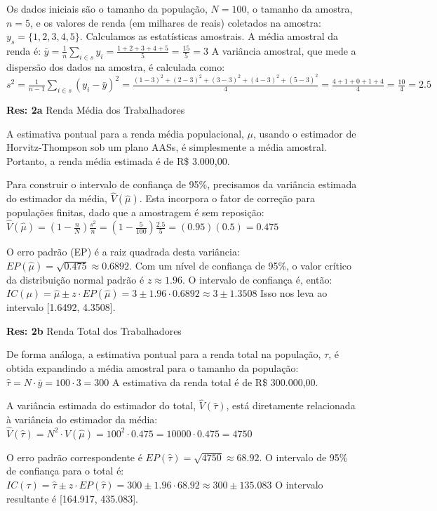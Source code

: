 \documentclass[a4paper,11pt,oneside,twocolumn]{Config/milktest}
\begin{document}
	
	{\scriptsize
		
		Os dados iniciais são o tamanho da população, $N=100$, o tamanho da amostra, $n=5$, e os valores de renda (em milhares de reais) coletados na amostra: $y_s = \{1, 2, 3, 4, 5\}$. Calculamos as estatísticas amostrais. A média amostral da renda é:
		$ \bar{y} = \frac{1}{n} \sum_{i \in s} y_i = \frac{1+2+3+4+5}{5} = \frac{15}{5} = 3 $ 
		A variância amostral, que mede a dispersão dos dados na amostra, é calculada como:
		$ s^2 = \frac{1}{n-1} \sum_{i \in s} (y_i - \bar{y})^2 = \frac{(1-3)^2 + (2-3)^2 + (3-3)^2 + (4-3)^2 + (5-3)^2}{4} = \frac{4+1+0+1+4}{4} = \frac{10}{4} = 2.5 $
		
		\textbf{Res:  2a}  Renda Média dos Trabalhadores
		
		A estimativa pontual para a renda média populacional, $\mu$, usando o estimador de Horvitz-Thompson sob um plano AASs, é simplesmente a média amostral. Portanto, a renda média estimada é de R\$ 3.000,00.
		
		Para construir o intervalo de confiança de 95\%, precisamos da variância estimada do estimador da média, $\hat{V}(\hat{\mu})$. Esta incorpora o fator de correção para populações finitas, dado que a amostragem é sem reposição:
		$ \hat{V}(\hat{\mu}) = \left(1 - \frac{n}{N}\right) \frac{s^2}{n} = \left(1 - \frac{5}{100}\right) \frac{2.5}{5} = (0.95)(0.5) = 0.475 $
		
		O erro padrão (EP) é a raiz quadrada desta variância: $EP(\hat{\mu}) = \sqrt{0.475} \approx 0.6892$.
		Com um nível de confiança de 95\%, o valor crítico da distribuição normal padrão é $z \approx 1.96$. O intervalo de confiança é, então:
		$ IC(\mu) = \hat{\mu} \pm z \cdot EP(\hat{\mu}) = 3 \pm 1.96 \cdot 0.6892 \approx 3 \pm 1.3508 $
		Isso nos leva ao intervalo [1.6492, 4.3508].
		
		\medskip
		\textbf{Res:  2b}   Renda Total dos Trabalhadores
		
		De forma análoga, a estimativa pontual para a renda total na população, $\tau$, é obtida expandindo a média amostral para o tamanho da população:
		$ \hat{\tau} = N \cdot \bar{y} = 100 \cdot 3 = 300 $
		A estimativa da renda total é de R\$ 300.000,00.
		
		A variância estimada do estimador do total, $\hat{V}(\hat{\tau})$, está diretamente relacionada à variância do estimador da média:
		$ \hat{V}(\hat{\tau}) = N^2 \cdot \hat{V}(\hat{\mu}) = 100^2 \cdot 0.475 = 10000 \cdot 0.475 = 4750 $
		
		O erro padrão correspondente é $EP(\hat{\tau}) = \sqrt{4750} \approx 68.92$. O intervalo de 95\% de confiança para o total é:
		$ IC(\tau) = \hat{\tau} \pm z \cdot EP(\hat{\tau}) = 300 \pm 1.96 \cdot 68.92 \approx 300 \pm 135.083 $
		O intervalo resultante é [164.917, 435.083]. 
		
	}
	
\end{document}
